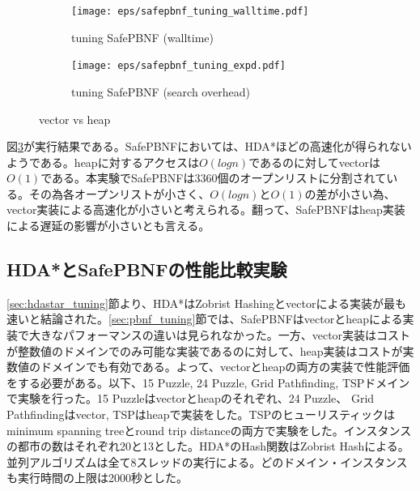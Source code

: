 \documentclass[uplatex]{jsarticle}
\begin{document}
\begin{figure}
	\centering
	\begin{subfigure}{0.4\columnwidth}
		\texttt{[image: eps/safepbnf\_tuning\_walltime.pdf]}
		\caption{tuning SafePBNF (walltime)}
		\label{fig:safepbnf_tuning_walltime}
	\end{subfigure}
	\begin{subfigure}{0.4\columnwidth}
		\texttt{[image: eps/safepbnf\_tuning\_expd.pdf]}
		\caption{tuning SafePBNF (search overhead)}
		\label{fig:safepbnf_tuning_expd}
	\end{subfigure}
	\label{fig:safepbnf_tuning}
	\caption{vector vs heap}
\end{figure}

図\ref{fig:safepbnf_tuning}が実行結果である。SafePBNFにおいては、HDA*ほどの高速化が得られないようである。heapに対するアクセスは$O(logn)$であるのに対してvectorは$O(1)$である。本実験でSafePBNFは3360個のオープンリストに分割されている。その為各オープンリストが小さく、$O(logn)$と$O(1)$の差が小さい為、vector実装による高速化が小さいと考えられる。翻って、SafePBNFはheap実装による遅延の影響が小さいとも言える。

\subsection{HDA*とSafePBNFの性能比較実験}

\ref{sec:hdastar_tuning}節より、HDA*はZobrist Hashingとvectorによる実装が最も速いと結論された。\ref{sec:pbnf_tuning}節では、SafePBNFはvectorとheapによる実装で大きなパフォーマンスの違いは見られなかった。一方、vector実装はコストが整数値のドメインでのみ可能な実装であるのに対して、heap実装はコストが実数値のドメインでも有効である。よって、vectorとheapの両方の実装で性能評価をする必要がある。以下、15 Puzzle, 24 Puzzle, Grid Pathfinding, TSPドメインで実験を行った。15 Puzzleはvectorとheapのそれぞれ、24 Puzzle、 Grid Pathfindingはvector, TSPはheapで実装をした。TSPのヒューリスティックはminimum spanning treeとround trip distanceの両方で実験をした。インスタンスの都市の数はそれぞれ20と13とした。HDA*のHash関数はZobrist Hashによる。並列アルゴリズムは全て8スレッドの実行による。どのドメイン・インスタンスも実行時間の上限は2000秒とした。
\end{document}
